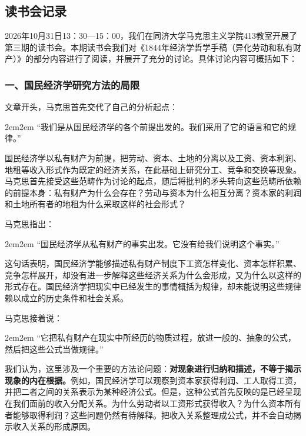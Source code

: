 \documentclass[a4paper,twoside,12pt,AutoFakeBold]{ctexart}
\begin{document}
\subsection{读书会记录}
2026年10月31日13：30—15：00，我们在同济大学马克思主义学院413教室开展了第三期的读书会。本期读书会我们对《1844年经济学哲学手稿（异化劳动和私有财产）》的部分内容进行了阅读，并展开了充分的讨论。具体讨论内容可概括如下：

\subsubsection{一、国民经济学研究方法的局限}\label{sec:3.1}

文章开头，马克思首先交代了自己的分析起点：

\begin{adjustwidth}{2em}{2em}
\qquad\fangsong
“我们是从国民经济学的各个前提出发的。我们采用了它的语言和它的规律。”
\end{adjustwidth}

国民经济学以私有财产为前提，把劳动、资本、土地的分离以及工资、资本利润、地租等收入形式作为既定的经济关系，在此基础上研究分工、竞争和交换等现象。马克思首先接受这些范畴作为讨论的起点，随后将批判的矛头转向这些范畴所依赖的前提本身：私有财产为什么会存在？劳动与资本为什么相互分离？资本家的利润和土地所有者的地租为什么采取这样的社会形式？

马克思指出：

\begin{adjustwidth}{2em}{2em}
\qquad\fangsong
“国民经济学从私有财产的事实出发。它没有给我们说明这个事实。”
\end{adjustwidth}

这句话表明，国民经济学能够描述私有财产制度下工资怎样变化、资本怎样积累、竞争怎样展开，却没有进一步解释这些经济关系为什么会形成，又为什么以这样的形式存在。国民经济学把现实中已经发生的事情概括为规律，却未能说明这些规律赖以成立的历史条件和社会关系。

马克思接着说：

\begin{adjustwidth}{2em}{2em}
\qquad\fangsong
“它把私有财产在现实中所经历的物质过程，放进一般的、抽象的公式，然后把这些公式当做规律。”
\end{adjustwidth}

我们认为，这里涉及一个重要的方法论问题：\textbf{对现象进行归纳和描述，不等于揭示现象的内在根据。}例如，国民经济学可以观察到资本家获得利润、工人取得工资，并把二者之间的关系表示为某种经济公式。但是，这种公式首先反映的是已经呈现在我们面前的收入分配关系。为什么劳动者以工资形式获得收入？为什么资本所有者能够取得利润？这些问题仍然有待解释。把收入关系整理成公式，并不会自动揭示收入关系的形成原因。
\end{document}
